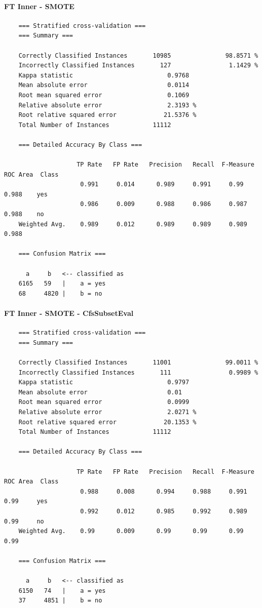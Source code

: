 \paragraph{FT Inner - SMOTE}
{\footnotesize
	\begin{verbatim}
	=== Stratified cross-validation ===
	=== Summary ===
	
	Correctly Classified Instances       10985               98.8571 %
	Incorrectly Classified Instances       127                1.1429 %
	Kappa statistic                          0.9768
	Mean absolute error                      0.0114
	Root mean squared error                  0.1069
	Relative absolute error                  2.3193 %
	Root relative squared error             21.5376 %
	Total Number of Instances            11112     
	
	=== Detailed Accuracy By Class ===
	
	                TP Rate   FP Rate   Precision   Recall  F-Measure   ROC Area  Class
	                 0.991     0.014      0.989     0.991     0.99       0.988    yes
	                 0.986     0.009      0.988     0.986     0.987      0.988    no
	Weighted Avg.    0.989     0.012      0.989     0.989     0.989      0.988
	
	=== Confusion Matrix ===
	
	  a     b   <-- classified as
	6165   59   |    a = yes
	68     4820 |    b = no	
	\end{verbatim}
}

\paragraph{FT Inner - SMOTE - CfsSubsetEval}
{\footnotesize
	\begin{verbatim}
	=== Stratified cross-validation ===
	=== Summary ===
	
	Correctly Classified Instances       11001               99.0011 %
	Incorrectly Classified Instances       111                0.9989 %
	Kappa statistic                          0.9797
	Mean absolute error                      0.01  
	Root mean squared error                  0.0999
	Relative absolute error                  2.0271 %
	Root relative squared error             20.1353 %
	Total Number of Instances            11112     
	
	=== Detailed Accuracy By Class ===
	
	                TP Rate   FP Rate   Precision   Recall  F-Measure   ROC Area  Class
	                 0.988     0.008      0.994     0.988     0.991      0.99     yes
	                 0.992     0.012      0.985     0.992     0.989      0.99     no
	Weighted Avg.    0.99      0.009      0.99      0.99      0.99       0.99 
	
	=== Confusion Matrix ===
	
	  a     b   <-- classified as
	6150   74   |    a = yes
	37     4851 |    b = no
	\end{verbatim}
}

